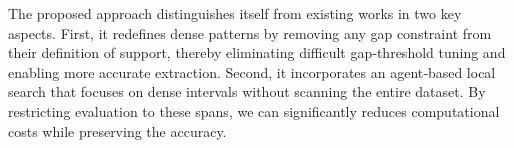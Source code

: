 The proposed approach distinguishes itself from existing works in two key aspects. First, it redefines dense patterns by removing any gap constraint from their definition of support, thereby eliminating difficult gap‑threshold tuning and enabling more accurate extraction. Second, it incorporates an agent‑based local search that focuses on dense intervals without scanning the entire dataset. By restricting evaluation to these spans, we can significantly reduces computational costs while preserving the accuracy.
